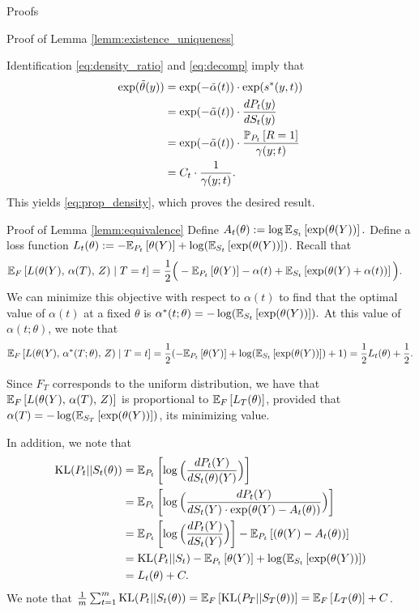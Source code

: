 \documentclass{article}
\theoremstyle{definition}
\theoremstyle{plain}
\theoremstyle{remark}
\begin{document}
\begin{section}{Proofs}
\begin{subsection}{Proof of Lemma \ref{lemm:existence_uniqueness}}
\begin{subsubsection}{Identification}
\eqref{eq:density_ratio} and \eqref{eq:decomp} imply that
\begin{align*}
\exp(\tilde{\theta}(y)) &= \exp(- \tilde{\alpha}(t)) \cdot \exp(s^{*}(y, t)) \\
&= \exp(- \tilde{\alpha}(t)) \cdot \frac{dP_{t}(y)}{dS_{t}(y)} \\
&= \exp(- \tilde{\alpha}(t)) \cdot \frac{\PP[P_{t}]{R=1}}{\gamma(y;t)} \\
&= C_{t} \cdot \frac{1}{\gamma(y;t)}.
\end{align*}
This yields \eqref{eq:prop_density}, which proves the desired result.

\end{subsubsection}

\end{subsection}

\begin{subsection}{Proof of Lemma \ref{lemm:equivalence}}
Define $A_{t}(\theta):= \log \EE[S_{t}]{\exp(\theta(Y))}.$ Define a loss function $L_{t}(\theta) := - \EE[P_{t}]{\theta(Y)} +  \log(\EE[S_{t}]{\exp(\theta(Y))})$. Recall that
\begin{align*}
\EE[F]{L(\theta(Y),\, \alpha(T),\, Z) \mid T=t} &= \frac{1}{2} \Big( -\EE[P_{t}]{\theta(Y)} - \alpha(t) + \EE[S_{t}]{\exp(\theta(Y)+ \alpha(t))} \Big).
\end{align*}
We can minimize this objective with respect to $\alpha(t)$ to find that the optimal value of $\alpha(t)$ at a fixed $\theta$ is $\alpha^{*}(t; \theta) = - \log(\EE[S_{t}]{\exp(\theta(Y))}).$ At this value of $\alpha(t; \theta)$, we note that
\[ \EE[F]{L(\theta(Y),\, \alpha^{*}(T; \theta),\, Z) \mid T=t} = \frac{1}{2}(-\EE[P_{t}]{\theta(Y)} + \log(\EE[S_{t}]{\exp(\theta(Y))}) + 1)= \frac{1}{2} L_{t}(\theta) + \frac{1}{2}.\]

Since $F_{T}$ corresponds to the uniform distribution, we have that $\EE[F]{L(\theta(Y),\, \alpha(T),\, Z)}$ is proportional to $\EE[F]{L_{T}(\theta)}$, provided that $\alpha(T)= - \log(\EE[S_{T}]{\exp(\theta(Y))})$, its minimizing value.

In addition, we note that
\begin{align*}
\text{KL}(P_{t} || S_{t}(\theta)) &= \EE[P_{t}]{\log\Big(\frac{dP_{t}(Y)}{dS_{t}(\theta)(Y)}\Big)} \\
&= \EE[P_{t}]{\log\Big(\frac{dP_{t}(Y)}{dS_{t}(Y) \cdot \exp(\theta(Y) - A_{t}(\theta))}\Big)} \\
&= \EE[P_{t}]{\log \Big( \frac{dP_{t}(Y)}{dS_{t}(Y)} \Big)} - \EE[P_{t}]{(\theta(Y) - A_{t}(\theta))} \\
&= \text{KL}(P_{t} || S_{t}) - \EE[P_{t}]{\theta(Y)} +  \log(\EE[S_{t}]{\exp(\theta(Y))}) \\
&= L_{t}(\theta) + C.
\end{align*}
We note that $\frac{1}{m} \sum_{t=1}^{m} \text{KL}(P_{t} || S_{t}(\theta)) = \EE[F]{\text{KL}(P_{T} || S_{T}(\theta))} = \EE[F]{L_{T}(\theta)} + C$.


\end{subsection}
\end{section}
\end{document}
